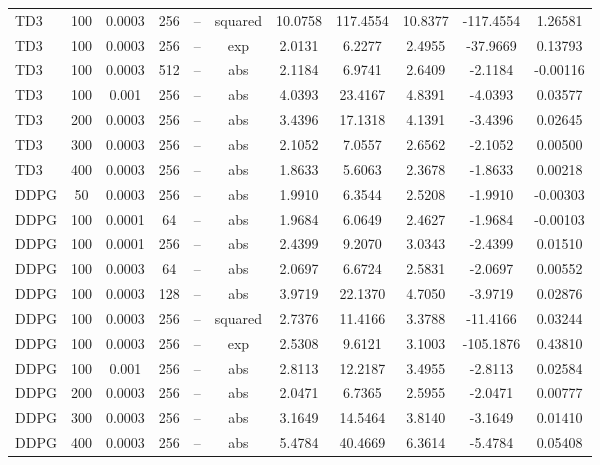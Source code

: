 \documentclass[11pt]{article}
\begin{document}
\begin{table}[h!]
\begin{tabular}{|lccccc|ccccc|}
TD3 & 100 & 0.0003 & 256 & --   & squared & 10.0758 & 117.4554 & 10.8377 & -117.4554 & 1.26581 \\
TD3 & 100 & 0.0003 & 256 & --   & exp & 2.0131 & 6.2277 & 2.4955 & -37.9669 & 0.13793 \\
TD3 & 100 & 0.0003 & 512 & --   & abs & 2.1184 & 6.9741 & 2.6409 & -2.1184 & -0.00116 \\
TD3 & 100 & 0.001  & 256 & --   & abs & 4.0393 & 23.4167 & 4.8391 & -4.0393 &  0.03577 \\
TD3 & 200 & 0.0003 & 256 & --   & abs & 3.4396 & 17.1318 & 4.1391 & -3.4396 &  0.02645 \\
TD3 & 300 & 0.0003 & 256 & --   & abs & 2.1052 & 7.0557 & 2.6562 & -2.1052 &  0.00500 \\
TD3 & 400 & 0.0003 & 256 & --   & abs & 1.8633 & 5.6063 & 2.3678 & -1.8633 &  0.00218 \\
DDPG & 50  & 0.0003 & 256 & --   & abs & 1.9910 & 6.3544 & 2.5208 & -1.9910 & -0.00303 \\
DDPG & 100 & 0.0001 & 64  & --   & abs & 1.9684 & 6.0649 & 2.4627 & -1.9684 & -0.00103 \\
DDPG & 100 & 0.0001 & 256 & --   & abs & 2.4399 & 9.2070 & 3.0343 & -2.4399 &  0.01510 \\
DDPG & 100 & 0.0003 & 64  & --   & abs & 2.0697 & 6.6724 & 2.5831 & -2.0697 &  0.00552 \\
DDPG & 100 & 0.0003 & 128 & --   & abs & 3.9719 & 22.1370 & 4.7050 & -3.9719 &  0.02876 \\
DDPG & 100 & 0.0003 & 256 & --   & squared & 2.7376 & 11.4166 & 3.3788 & -11.4166 & 0.03244 \\
DDPG & 100 & 0.0003 & 256 & --   & exp & 2.5308 & 9.6121 & 3.1003 & -105.1876 & 0.43810 \\
DDPG & 100 & 0.001  & 256 & --   & abs & 2.8113 & 12.2187 & 3.4955 & -2.8113 &  0.02584 \\
DDPG & 200 & 0.0003 & 256 & --   & abs & 2.0471 & 6.7365 & 2.5955 & -2.0471 &  0.00777 \\
DDPG & 300 & 0.0003 & 256 & --   & abs & 3.1649 & 14.5464 & 3.8140 & -3.1649 &  0.01410 \\
DDPG & 400 & 0.0003 & 256 & --   & abs & 5.4784 & 40.4669 & 6.3614 & -5.4784 &  0.05408 \\
\hline
\end{tabular}
\label{tab:allvalues}
\end{table}
\end{document}
